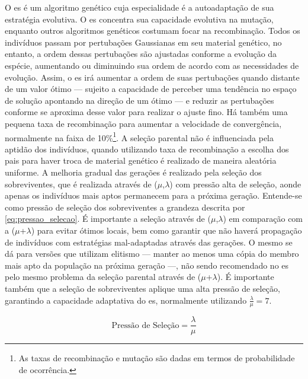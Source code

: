 O \acs{es} é um algoritmo genético cuja especialidade é a
autoadaptação de sua estratégia evolutiva. O \acs{es} concentra sua
capacidade evolutiva na mutação, enquanto outros algoritmos genéticos
costumam focar na recombinação. Todos os indivíduos passam por
pertubações Gaussianas em seu material genético, no entanto, a ordem
dessas pertubações são ajustadas conforme a evolução da espécie,
aumentando ou diminuindo sua ordem de acordo com as necessidades de
evolução. Assim, o \acs{es} irá aumentar a ordem de suas pertubações
quando distante de um valor ótimo --- sujeito a capacidade de perceber
uma tendência no espaço de solução apontando na direção de um ótimo
--- e reduzir as pertubações conforme se aproxima desse valor para
realizar o ajuste fino. Há também uma pequena taxa de recombinação
para aumentar a velocidade de convergência, normalmente na faixa de
10\%\footnote{As taxas de recombinação e mutação são dadas em termos
de probabilidade de ocorrência.}. A seleção parental não é influenciada pela aptidão
dos indivíduos, quando utilizando taxa de recombinação a escolha dos
pais para haver troca de material genético é realizado de maneira
aleatória uniforme. A melhoria gradual das gerações é realizado pela
seleção dos sobreviventes, que é realizada através de
($\mu$,$\lambda$) com pressão alta de seleção, aonde apenas os
indivíduos mais aptos permanecem para a próxima geração. Entende-se como pressão
de seleção dos sobreviventes a grandeza descrita por
\ref{eq:pressao_selecao}. É importante a seleção
através de ($\mu$,$\lambda$) em comparação com a ($\mu$+$\lambda$)
para evitar ótimos locais, bem como garantir que não haverá propagação
de indivíduos com estratégias mal-adaptadas através das gerações. O
mesmo se dá para versões que utilizam elitismo --- manter ao menos uma
cópia do membro mais apto da população na próxima geração ---, não
sendo recomendado no \acs{es} pelo mesmo problema da seleção parental
através de ($\mu$+$\lambda$). É importante também que a seleção de
sobreviventes aplique uma alta pressão de seleção, garantindo a
capacidade adaptativa do \acs{es}, normalmente utilizando
$\frac{\lambda}{\mu}=7$.

\begin{equation}\label{eq:pressao_selecao}
\text{Pressão de Seleção} = \dfrac{\lambda}{\mu}
\end{equation}

